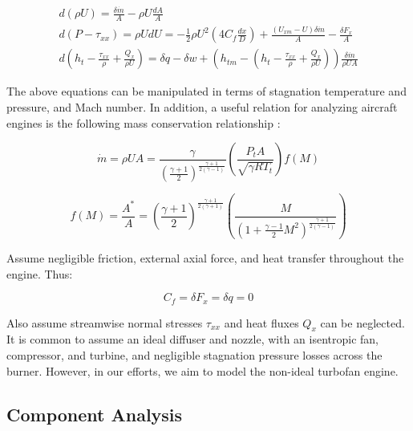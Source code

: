 \documentclass{article}
\begin{document}
\begin{gather}
\label{eq:equation_of_motion1}
d(\rho U) = \frac{\delta \dot{m}}{A} - \rho U \frac{dA}{A} \\
\label{eq:equation_of_motion2}
d(P - \tau_{xx}) = \rho U dU = - \frac{1}{2} \rho U^2 \left( 4 C_f \frac{dx}{D} \right) + \frac{(U_{xm} - U) \delta \dot{m}}{A} - \frac{\delta F_x}{A} \\
\label{eq:equation_of_motion3}
d \left( h_t - \frac{\tau_{xx}}{\rho} + \frac{Q_x}{\rho U} \right) = \delta q - \delta w + \left( h_{tm} - \left	( h_t - \frac{\tau_{xx}}{\rho} + \frac{Q_x}{\rho U} \right) \right) \frac{\delta \dot{m}}{\rho U A}
\end{gather}

The above equations can be manipulated in terms of stagnation temperature and pressure, and Mach number. In addition, a useful relation for analyzing aircraft engines is the following mass conservation relationship \cite{cantwell283}:

\begin{equation}
\label{eq:mdot}
\dot{m} = \rho U A = \frac{\gamma}{\left( \frac{\gamma + 1}{2} \right)^{ \frac{\gamma + 1}{2 (\gamma - 1)}}} \left( \frac{P_t A}{\sqrt{ \gamma R T_t}} \right) f(M)
\end{equation}

\begin{equation}
\label{eq:area_mach_function}
f(M) = \frac{A^*}{A} = \left( \frac{\gamma + 1}{2} \right)^{\frac{\gamma + 1}{2 (\gamma + 1)}} \left( \frac{M}{\left( 1 + \frac{\gamma -1}{2} M^2 \right)^{\frac{\gamma + 1}{2 (\gamma - 1)}}}\right)
\end{equation}

Assume negligible friction, external axial force, and heat transfer throughout the engine. Thus:

\begin{equation*}
C_f = \delta F_x = \delta q = 0
\end{equation*}

Also assume streamwise normal stresses $\tau_{xx}$ and heat fluxes $Q_x$ can be neglected. It is common to assume an ideal diffuser and nozzle, with an isentropic fan, compressor, and turbine, and negligible stagnation pressure losses across the burner. However, in our efforts, we aim to model the non-ideal turbofan engine.

\subsection{Component Analysis}
\end{document}
